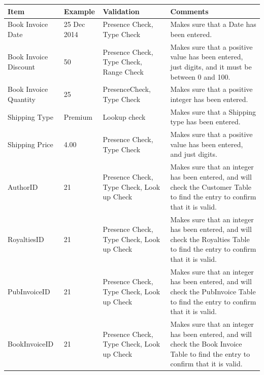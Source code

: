 \begin{center}
    \begin{tabular}{|p{2.5cm}|p{2cm}|p{2cm}|p{3.5cm}|}
    \hline
    \textbf{Item} & \textbf{Example} & \textbf{Validation} & \textbf{Comments}\\ \hline
    Book Invoice Date & 25 Dec 2014 & Presence Check, Type Check & Makes sure that a Date has been entered. \\ \hline
    Book Invoice Discount & 50 & Presence Check, Type Check, Range Check & Makes sure that a positive value has been entered, just digits, and it must be between 0 and 100. \\ \hline
    Book Invoice Quantity & 25 & PresenceCheck, Type Check & Makes sure that a positive integer has been entered. \\ \hline
    Shipping Type & Premium & Lookup check & Makes sure that a Shipping type has been entered. \\ \hline
    Shipping Price & 4.00 & Presence Check, Type Check & Makes sure that a positive value has been entered, and just digits. \\ \hline
    AuthorID & 21 & Presence Check, Type Check, Look up Check & Makes sure that an integer has been entered, and will check the Customer Table to find the entry to confirm that it is valid. \\ \hline 
    RoyaltiesID & 21 & Presence Check, Type Check, Look up Check & Makes sure that an integer has been entered, and will check the Royalties Table to find the entry to confirm that it is valid. \\ \hline
    PubInvoiceID & 21 & Presence Check, Type Check, Look up Check & Makes sure that an integer has been entered, and will check the PubInvoice Table to find the entry to confirm that it is valid. \\ \hline
    BookInvoiceID & 21 & Presence Check, Type Check, Look up Check & Makes sure that an integer has been entered, and will check the Book Invoice Table to find the entry to confirm that it is valid. \\ \hline
\end{tabular}
\end{center}


